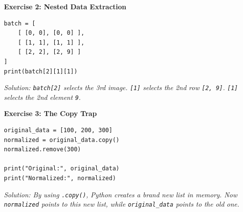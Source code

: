\vspace{1em}
\textbf{Exercise 2: Nested Data Extraction}
\begin{lstlisting}
batch = [
    [ [0, 0], [0, 0] ],   
    [ [1, 1], [1, 1] ],   
    [ [2, 2], [2, 9] ]    
]
print(batch[2][1][1])
\end{lstlisting}
\textit{Solution: \texttt{batch[2]} selects the 3rd image. \texttt{[1]} selects the 2nd row \texttt{[2, 9]}. \texttt{[1]} selects the 2nd element \texttt{9}.}

\vspace{1em}
\textbf{Exercise 3: The Copy Trap}
\begin{lstlisting}
original_data = [100, 200, 300]
normalized = original_data.copy()
normalized.remove(300)

print("Original:", original_data)
print("Normalized:", normalized)
\end{lstlisting}
\textit{Solution: By using \texttt{.copy()}, Python creates a brand new list in memory. Now \texttt{normalized} points to this new list, while \texttt{original\_data} points to the old one.}
